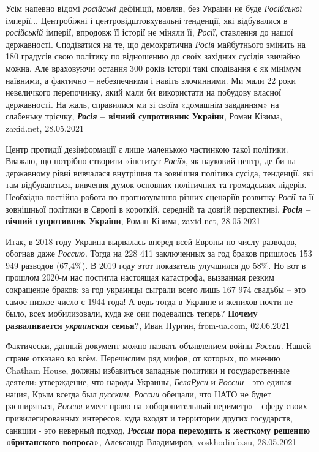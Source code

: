 Усім напевно відомі \emph{російські} дефініції, мовляв, без України не буде \emph{Російської}
імперії... Центробіжні і центровідштовхувальні тенденції, які відбувалися в
\emph{російській} імперії, впродовж її історії не міняли її, \emph{Росії}, ставлення до нашої
державності. Сподіватися на те, що демократична \emph{Росія} майбутнього змінить на
180 градусів свою політику по відношенню до своїх західних сусідів звичайно
можна. Але враховуючи остання 300 років історії такі сподівання є як мінімум
наївними, а фактично – небезпечними і навіть злочинними. Ми мали 22 роки
невеличкого перепочинку, який мали би використати на побудову власної
державності. На жаль, справилися ми зі своїм «домашнім завданням» на слабеньку
трієчку,
\textbf{\emph{Росія} – вічний супротивник України}, Роман Кізима, zaxid.net, 28.05.2021

Центр протидії дезінформації є лише маленькою частинкою такої політики. Вважаю,
що потрібно створити «інститут \emph{Росії}», як науковий центр, де би на державному
рівні вивчалася внутрішня та зовнішня політика сусіда, тенденції, які там
відбуваються, вивчення думок основних політичних та громадських лідерів.
Необхідна постійна робота по прогнозуванню різних сценаріїв розвитку \emph{Росії} та
її зовнішньої політики в Європі в короткій, середній та довгій перспективі,
\textbf{\emph{Росія} – вічний супротивник України}, Роман Кізима, zaxid.net, 28.05.2021

Итак, в 2018 году Украина вырвалась вперед всей Европы по числу разводов,
обогнав даже \emph{Россию}. Тогда на 228 411 заключенных за год браков пришлось
153 949 разводов (67,4\%). В 2019 году этот показатель улучшился до 58\%. Но
вот в прошлом 2020-м нас постигла настоящая катастрофа, вызванная резким
сокращение браков: за год украинцы сыграли всего лишь 167 974 свадьбы – это
самое низкое число с 1944 года! А ведь тогда в Украине и женихов почти не было,
всех мобилизовали, куда же они подевались теперь?
\textbf{Почему разваливается \emph{украинская} семья?}, Иван Пургин, from-ua.com, 02.06.2021

Фактически, данный документ можно назвать объявлением войны \emph{России}. Нашей
стране отказано во всём. Перечислим ряд мифов, от которых, по мнению  Chatham
House, должны избавиться западные политики и государственные деятели:
утверждение, что народы Украины, \emph{БелаРуси} и \emph{России} - это единая нация, Крым
всегда был \emph{русским}, \emph{России} обещали, что НАТО не будет расширяться, \emph{Россия} имеет
право на «оборонительный периметр» - сферу своих привилегированных интересов,
куда входят и территории других государств, санкции - это неверный подход,
\textbf{\emph{России} пора переходить к жесткому решению «британского вопроса»}, 
Александр Владимиров, voskhodinfo.su, 28.05.2021

